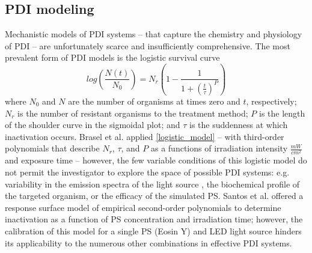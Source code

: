 \subsection{PDI modeling}
Mechanistic models of PDI systems -- that capture the chemistry and physiology of PDI -- are unfortunately scarce and insufficiently comprehensive. The most prevalent form of PDI models is the logistic survival curve \cite{Sabino2019InactivationTherapy,Buchovec2009NovelPhotosensitization,Dementavicius2016ApplicationPhotosensitization, Aponiene2015ReductionTreatments, Vaitonis2010Led-basedBacteria}
\begin{equation} \label{logistic_model}
    log\left( \frac{N(t)}{N_0} \right) = N_r\left( 1- \frac{1}{1+\left( \frac{t}{\tau} \right)^{P}} \right)
\end{equation}
where $N_0$ and $N$ are the number of organisms at times zero and $t$, respectively; $N_r$ is the number of resistant organisms to the treatment method; $P$ is the length of the shoulder curve in the sigmoidal plot; and $\tau$ is the suddenness at which inactivation occurs. Brasel et al. \cite{Brasel2020AnAgalactiae} applied \cref{logistic_model} -- with third-order polynomials that describe $N_r$, $\tau$, and $P$ as a functions of irradiation intensity $\frac{mW}{cm^2}$ and exposure time -- however, the few variable conditions of this logistic model do not permit the investigator to explore the space of possible PDI systems: e.g. variability in the emission spectra of the light source \cite{Brancaleon2002LaserTherapy}, the biochemical profile of the targeted organism, or the efficacy of the simulated PS. Santos et al. \cite{Santos2020ApplicationAureus} offered a response surface model of empirical second-order polynomials to determine inactivation as a function of PS concentration and irradiation time; however, the calibration of this model for a single PS (Eosin Y) and LED light source hinders its applicability to the numerous other combinations in effective PDI systems.

